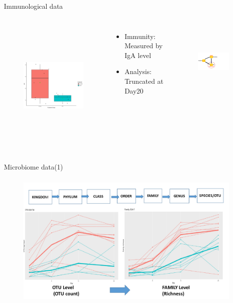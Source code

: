 \documentclass[a4paper,9pt]{beamer}
\begin{document}
\begin{frame}{\huge{Immunological data}}
\begin{columns}
\begin{figure}[H]
\centering
\includegraphics[scale =0.4,height=6.6cm,width=7.5cm]{a.pdf}
\end{figure}

\begin{itemize}
\small
\item Immunity: Measured by IgA level
\item Analysis: Truncated at Day20
\end{itemize}
\begin{figure}[H]
\centering
\includegraphics[scale =0.2,height=4cm,width=3.9cm]{ii.pdf}
\end{figure}
\end{columns}
\end{frame}

\begin{frame}{\huge{Microbiome data(1)}}
\begin{figure}[H]
\centering
\includegraphics[scale=9,height=6.8cm,width=11.7cm]{otufam.pdf}
\end{figure}
\end{frame}
\end{document}
